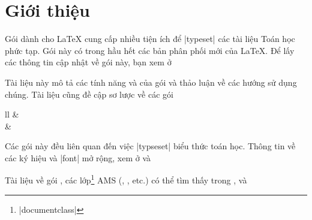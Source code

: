 \documentclass[11pt,leqno,titlepage,openany,oneside]{amsldoc}[1999/12/13]
\begin{document}
\chapter{Giới thiệu}

Gói  dành cho \LaTeX{} cung cấp nhiều tiện ích để |typeset|
các tài liệu Toán học phức tạp. Gói này có trong hầu hết các bản phân phối
mới của \LaTeX{}. Để lấy các thông tin cập nhật về gói này, bạn xem ở

\medskip
{}
\medskip

Tài liệu này mô tả các tính năng và của gói  và thảo luận
về các hướng sử dụng chúng. Tài liệu cũng đề cập sơ lược về các gói
\begin{ctab}{ll}
& \\
& \\
\end{ctab}
Các gói này đều liên quan đến việc |typseset| biểu thức toán học.
Thông tin về các ký hiệu và |font| mở rộng, xem ở \cite{amsfonts} và

\medskip
{}
\medskip
\noindent
Tài liệu về gói , các lớp\footnote{|documentclass|} AMS (,
, etc.\@) có thể tìm thấy trong \cite{amsthdoc}, \cite{instr-l}
và 
\end{document}
